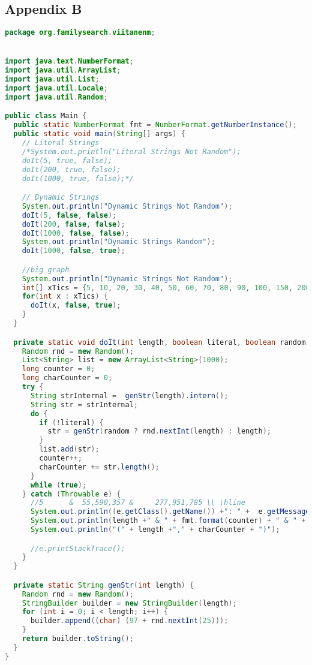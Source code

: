 \subsection*{Appendix B} \label{App:AppendixB}
\begin{lstlisting}[language=Java]
package org.familysearch.viitanenm;


import java.text.NumberFormat;
import java.util.ArrayList;
import java.util.List;
import java.util.Locale;
import java.util.Random;

public class Main {
  public static NumberFormat fmt = NumberFormat.getNumberInstance();
  public static void main(String[] args) {
    // Literal Strings
    /*System.out.println("Literal Strings Not Random");
    doIt(5, true, false);
    doIt(200, true, false);
    doIt(1000, true, false);*/

    // Dynamic Strings
    System.out.println("Dynamic Strings Not Random");
    doIt(5, false, false);
    doIt(200, false, false);
    doIt(1000, false, false);
    System.out.println("Dynamic Strings Random");
    doIt(1000, false, true);

    //big graph
    System.out.println("Dynamic Strings Not Random");
    int[] xTics = {5, 10, 20, 30, 40, 50, 60, 70, 80, 90, 100, 150, 200, 250, 300, 350, 400, 450, 500, 600, 700, 800, 900, 1000};
    for(int x : xTics) {
      doIt(x, false, true);
    }
  }

  private static void doIt(int length, boolean literal, boolean random) {
    Random rnd = new Random();
    List<String> list = new ArrayList<String>(1000);
    long counter = 0;
    long charCounter = 0;
    try {
      String strInternal =  genStr(length).intern();
      String str = strInternal;
      do {
        if (!literal) {
          str = genStr(random ? rnd.nextInt(length) : length);
        }
        list.add(str);
        counter++;
        charCounter += str.length();
      }
      while (true);
    } catch (Throwable e) {
      //5      &  55,590,357 &     277,951,785 \\ \hline
      System.out.println((e.getClass().getName()) +": " +  e.getMessage());
      System.out.println(length +" & " + fmt.format(counter) + " & " + fmt.format(charCounter) + " \\\\ \\hline");
      System.out.println("(" + length +"," + charCounter + ")");

      //e.printStackTrace();
    }
  }

  private static String genStr(int length) {
    Random rnd = new Random();
    StringBuilder builder = new StringBuilder(length);
    for (int i = 0; i < length; i++) {
      builder.append((char) (97 + rnd.nextInt(25)));
    }
    return builder.toString();
  }
}
\end{lstlisting}
